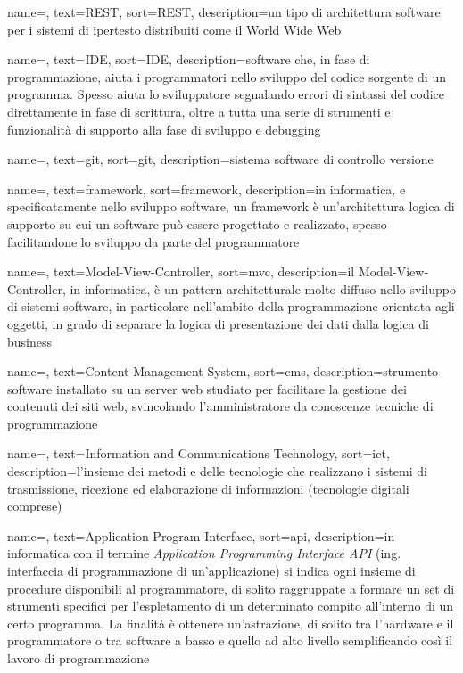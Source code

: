 {
	name=,
	text=REST,
	sort=REST,
	description={un tipo di architettura software per i sistemi di ipertesto distribuiti come il World Wide Web}
}

{
	name=,
	text=IDE,
	sort=IDE,
	description={software che, in fase di programmazione, aiuta i programmatori nello sviluppo del codice sorgente di un programma. Spesso aiuta lo sviluppatore segnalando errori di sintassi del codice direttamente in fase di scrittura, oltre a tutta una serie di strumenti e funzionalità di supporto alla fase di sviluppo e debugging}
}

{
	name=,
	text=git,
	sort=git,
	description={sistema software di controllo versione}
}

{
	name=,
	text=framework,
	sort=framework,
	description={in informatica, e specificatamente nello sviluppo software, un framework è un'architettura logica di supporto su cui un software può essere progettato e realizzato, spesso facilitandone lo sviluppo da parte del programmatore}
}

{
	name=,
	text=Model-View-Controller,
	sort=mvc,
	description={il Model-View-Controller, in informatica, è un pattern architetturale molto diffuso nello sviluppo di sistemi software, in particolare nell'ambito della programmazione orientata agli oggetti, in grado di separare la logica di presentazione dei dati dalla logica di business}
}

{
	name=,
	text=Content Management System,
	sort=cms,
	description={strumento software installato su un server web studiato per facilitare la gestione dei contenuti dei siti web, svincolando l'amministratore da conoscenze tecniche di programmazione}
}

{
	name=,
	text=Information and Communications Technology,
	sort=ict,
	description={l'insieme dei metodi e delle tecnologie che realizzano i sistemi di trasmissione, ricezione ed elaborazione di informazioni (tecnologie digitali comprese)}
}

{
    name=,
    text=Application Program Interface,
    sort=api,
    description={in informatica con il termine \emph{Application Programming Interface API} (ing. interfaccia di programmazione di un'applicazione) si indica ogni insieme di procedure disponibili al programmatore, di solito raggruppate a formare un set di strumenti specifici per l'espletamento di un determinato compito all'interno di un certo programma. La finalità è ottenere un'astrazione, di solito tra l'hardware e il programmatore o tra software a basso e quello ad alto livello semplificando così il lavoro di programmazione}
}


